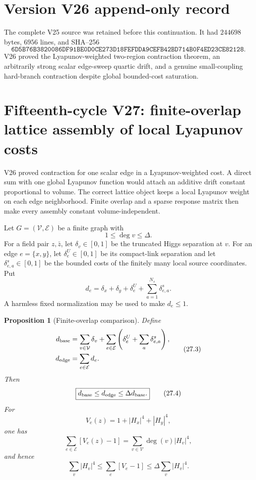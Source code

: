 \documentclass[11pt]{article}
\newtheorem{proposition}[theorem]{Proposition}
\theoremstyle{remark}
\begin{document}
\section*{Version V26 append-only record}
The complete V25 source was retained before this continuation.  It
had \(244698\) bytes, \(6956\) lines, and SHA--256
\[
 \texttt{6D5B76B3820086DF91BE0D0CE273D18FEFDDA9CEFB42BD714B0F4ED23CE82128}.
\]
V26 proved the Lyapunov-weighted two-region contraction theorem,
an arbitrarily strong scalar edge-sweep quartic drift, and a genuine
small-coupling hard-branch contraction despite global bounded-cost
saturation.
\section{Fifteenth-cycle V27: finite-overlap lattice assembly of local Lyapunov costs}
\label{sec:v15v27}

V26 proved contraction for one scalar edge in a Lyapunov-weighted
cost.  A direct sum with one global Lyapunov function would attach
an additive drift constant proportional to volume.  The correct
lattice object keeps a local Lyapunov weight on each edge
neighborhood.  Finite overlap and a sparse response matrix then
make every assembly constant volume-independent.

Let \(G=(\mathcal V,\mathcal E)\) be a finite graph with
\[
 1\le\deg v\le\Delta.                                      \tag{27.1}
\]
For a field pair \(z,\bar z\), let
\(\delta_v\in[0,1]\) be the truncated Higgs separation at \(v\).
For an edge \(e=\{x,y\}\), let \(\delta_e^U\in[0,1]\) be its
compact-link separation and let \(\delta_{e,a}^s\in[0,1]\) be the
bounded costs of the finitely many local source coordinates.  Put
\[
 d_e
 =
 \delta_x+\delta_y+\delta_e^U+\sum_{a=1}^{N_s}\delta_{e,a}^s.
                                                               \tag{27.2}
\]
A harmless fixed normalization may be used to make \(d_e\le1\).

\begin{proposition}[Finite-overlap comparison]
\label{prop:v15v27-overlap}
Define
\[
\begin{aligned}
 d_{\rm base}
 &=
 \sum_{v\in\mathcal V}\delta_v+
 \sum_{e\in\mathcal E}
 \left(\delta_e^U+\sum_a\delta_{e,a}^s\right),\\
 d_{\rm edge}
 &=\sum_{e\in\mathcal E}d_e.
\end{aligned}                                               \tag{27.3}
\]
Then
\[
 \boxed{
 d_{\rm base}\le d_{\rm edge}\le\Delta d_{\rm base}.}       \tag{27.4}
\]
For
\[
 V_e(z)=1+|H_x|^4+|H_y|^4,                                 \tag{27.5}
\]
one has
\[
 \sum_{e\in\mathcal E}[V_e(z)-1]
 =
 \sum_{v\in\mathcal V}\deg(v)|H_v|^4,                       \tag{27.6}
\]
and hence
\[
 \sum_v|H_v|^4
 \le\sum_e[V_e-1]
 \le\Delta\sum_v|H_v|^4.                                   \tag{27.7}
\]
\end{proposition}
\end{document}
